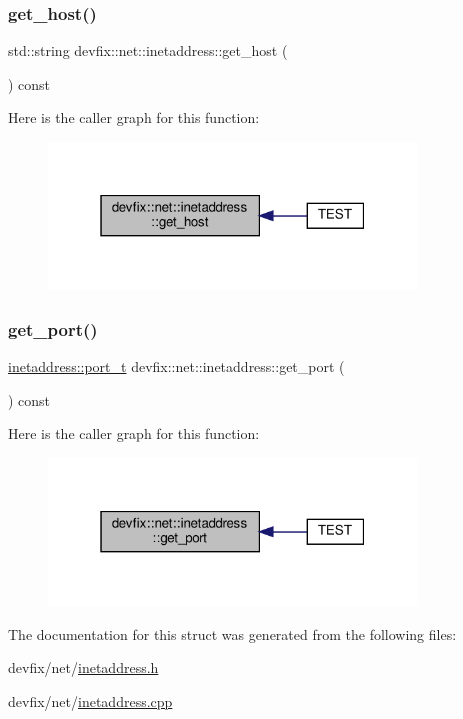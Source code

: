 \subsubsection{\texorpdfstring{get\+\_\+host()}{get\_host()}}
{\footnotesize\ttfamily std\+::string devfix\+::net\+::inetaddress\+::get\+\_\+host (\begin{DoxyParamCaption}{ }\end{DoxyParamCaption}) const\hspace{0.3cm}{\ttfamily [noexcept]}}

Here is the caller graph for this function\+:\nopagebreak
\begin{figure}[H]
\begin{center}
\leavevmode
\includegraphics[width=277pt]{structdevfix_1_1net_1_1inetaddress_a4524692fae7a767e38600012c6f8f3cf_icgraph}
\end{center}
\end{figure}
\mbox{\label{structdevfix_1_1net_1_1inetaddress_ad2c4af8ffc473aebc58bc1bbe0277e7d}} 
\subsubsection{\texorpdfstring{get\+\_\+port()}{get\_port()}}
{\footnotesize\ttfamily \hyperlink{structdevfix_1_1net_1_1inetaddress_a3eaadc730f2b4625987cf948ea485410}{inetaddress\+::port\+\_\+t} devfix\+::net\+::inetaddress\+::get\+\_\+port (\begin{DoxyParamCaption}{ }\end{DoxyParamCaption}) const}

Here is the caller graph for this function\+:\nopagebreak
\begin{figure}[H]
\begin{center}
\leavevmode
\includegraphics[width=277pt]{structdevfix_1_1net_1_1inetaddress_ad2c4af8ffc473aebc58bc1bbe0277e7d_icgraph}
\end{center}
\end{figure}


The documentation for this struct was generated from the following files\+:\begin{DoxyCompactItemize}
\item 
devfix/net/\hyperlink{inetaddress_8h}{inetaddress.\+h}\item 
devfix/net/\hyperlink{inetaddress_8cpp}{inetaddress.\+cpp}\end{DoxyCompactItemize}
